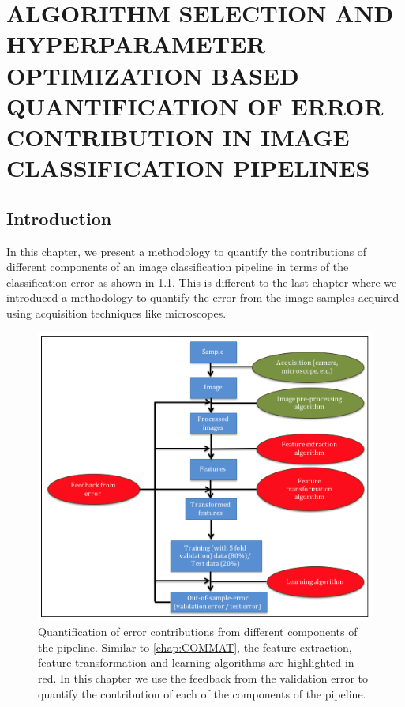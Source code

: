 \chapter{ALGORITHM SELECTION AND HYPERPARAMETER OPTIMIZATION BASED QUANTIFICATION OF ERROR CONTRIBUTION IN IMAGE CLASSIFICATION PIPELINES}
\label{chap:EP}

\let\thefootnote\relax{}

\section{Introduction} 
\label{sec1}
In this chapter, we present a methodology to quantify the contributions of different components of an image classification pipeline in terms of the classification error as shown in \ref{fig:chapter5}. This is different to the last chapter where we introduced a methodology to quantify the error from the image samples acquired using acquisition techniques like microscopes. 

\begin{figure}[ht!]
\centering
\includegraphics[width=1.0\textwidth]{img/chapter5}
\caption{Quantification of error contributions from different components of the pipeline. Similar to \ref{chap:COMMAT}, the feature extraction, feature transformation and learning algorithms are highlighted in red. In this chapter we use the feedback from the validation error to quantify the contribution of each of the components of the pipeline.}
\label{fig:chapter5}
\end{figure}


